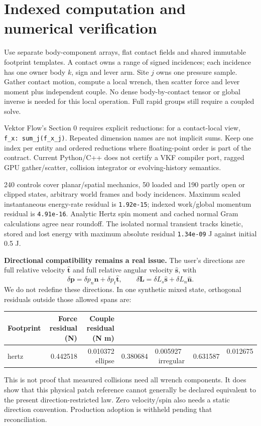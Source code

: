 \documentclass[10pt,a4paper]{article}
\newcommand{\toprule}{\hline}\newcommand{\midrule}{\hline}\newcommand{\bottomrule}{\hline}
\begin{document}
\newpage
\section*{Indexed computation and numerical verification}
Use separate body-component arrays, flat contact fields and shared immutable
footprint templates. A contact owns a range of signed incidences; each incidence
has one owner body $k$, sign and lever arm. Site $j$ owns one pressure sample.
Gather contact motion, compute a local wrench, then scatter force and lever moment
plus independent couple. No dense body-by-contact tensor or global inverse is
needed for this local operation. Full rapid groups still require a coupled solve.

Vektor Flow's Section 0 requires explicit reductions: for a contact-local view,
\texttt{f\_x: sum\_j(f\_x\_j)}. Repeated dimension names are not implicit sums.
Keep one index per entity and ordered reductions where floating-point order is
part of the contract. Current Python/C++ does not certify a VKF compiler port,
ragged GPU gather/scatter, collision integrator or evolving-history semantics.

240 controls cover planar/spatial mechanics, 50 loaded and 190 partly open or
clipped states, arbitrary world frames and body incidences. Maximum scaled
instantaneous energy-rate residual is \texttt{1.92e-15}; indexed work/global
momentum residual is \texttt{4.91e-16}. Analytic Hertz spin moment and cached
normal Gram calculations agree near roundoff. The isolated normal transient
tracks kinetic, stored and lost energy with maximum absolute residual
\texttt{1.34e-09} J against initial 0.5 J.

\textbf{Directional compatibility remains a real issue.}
The user's directions are full relative velocity $\hat{\mathbf t}$ and full
relative angular velocity $\hat{\mathbf s}$, with
\[
 \delta\mathbf p=\delta p_n\hat{\mathbf n}+\delta p_t\hat{\mathbf t},\qquad
 \delta\mathbf L=\delta L_s\hat{\mathbf s}+\delta L_n\hat{\mathbf n}.
\]
We do not redefine these directions. In one synthetic mixed state, orthogonal
residuals outside those allowed spans are:
\begin{center}\begin{tabular}{lrr}\toprule
Footprint & Force residual (N) & Couple residual (N m)\\\midrule
hertz & 0.442518 & 0.010372 \
ellipse & 0.380684 & 0.005927 \
irregular & 0.631587 & 0.012675 \
\bottomrule\end{tabular}\end{center}
This is not proof that measured collisions need all wrench components. It does
show that this physical patch reference cannot generally be declared equivalent
to the present direction-restricted law. Zero velocity/spin also needs a static
direction convention. Production adoption is withheld pending that reconciliation.
\end{document}
